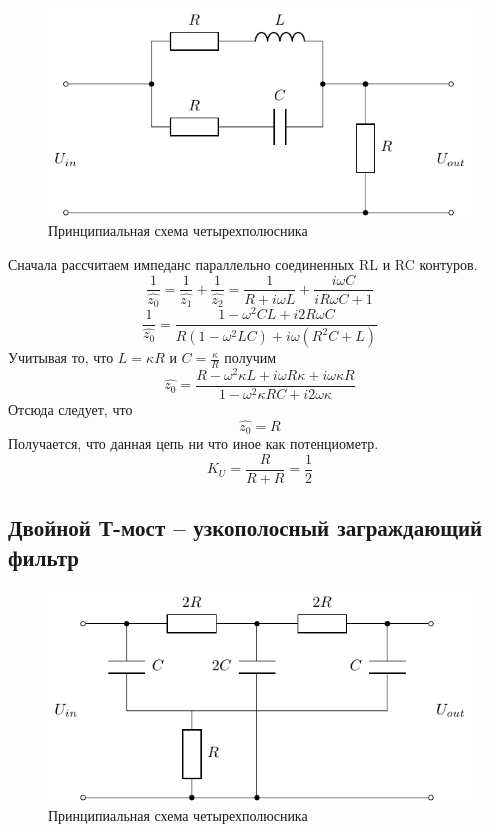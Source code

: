 \begin{figure}[H]
	\centering
	\includegraphics[]{chems/pic5}
	\caption{Принципиальная схема четырехполюсника}
	\label{fig:ph_ph}
\end{figure}


Сначала рассчитаем импеданс параллельно соединенных RL и RC контуров.
\begin{equation}
	\frac{1}{\hat{z_0}}=\frac{1}{\hat{z_1}}+\frac{1}{\hat{z_2}}=\frac{1}{R+i\omega L}+\frac{i\omega C}{iR\omega C+1}
\end{equation}
\begin{equation}
	\frac{1}{\hat{z_0}}=\frac{1-\omega^2 CL+i2R\omega C}{R(1-\omega^2 LC)+i\omega(R^2C+L)}
\end{equation}
Учитывая то, что $L=\kappa R$ и $C=\frac{\kappa}{R}$ получим
\begin{equation}
	\hat{z_0}=\frac{R-\omega^2\kappa L+i\omega R\kappa +i\omega \kappa R}{1-\omega^2\kappa RC+i2\omega\kappa}
\end{equation}
Отсюда следует, что
\begin{equation}
	\hat{z_0}=R
\end{equation}
Получается, что данная цепь ни что иное как потенциометр.
\begin{equation}
	K_U=\frac{R}{R+R}=\frac{1}{2}
\end{equation}


\subsection{Двойной Т-мост -- узкополосный заграждающий фильтр}

\begin{figure}[H]
	\centering
	\includegraphics[]{chems/pic6}
	\caption{Принципиальная схема четырехполюсника}
	\label{fig:ph_f}
\end{figure}

